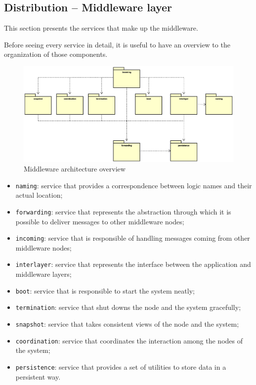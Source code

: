 \subsection{Distribution -- Middleware layer}
This section presents the services that make up the middleware.

Before seeing every service in detail, it is useful to have an overview to the
organization of those components.

\begin{figure}[H]
  \centering
  \includegraphics[width=\columnwidth]{images/solution/mw/overview.eps}
  \caption{Middleware architecture overview}
  \label{fig:mw-arch-over}
\end{figure} %

\begin{itemize}
  \item \texttt{naming}: service that provides a correspondence between logic
    names and their actual location;
  \item \texttt{forwarding}: service that represents the abstraction through
    which it is possible to deliver messages to other middleware nodes;
  \item \texttt{incoming}: service that is responsible of handling messages
    coming from other middleware nodes;
  \item \texttt{interlayer}: service that represents the interface between
    the application and middleware layers;
  \item \texttt{boot}: service that is responsible to start the system neatly;
  \item \texttt{termination}: service that shut downs the node and the system
    gracefully;
  \item \texttt{snapshot}: service that takes consistent views of the node and
    the system;
  \item \texttt{coordination}: service that coordinates the interaction among
    the nodes of the system;
  \item \texttt{persistence}: service that provides a set of utilities to
    store data in a persistent way.
\end{itemize}









